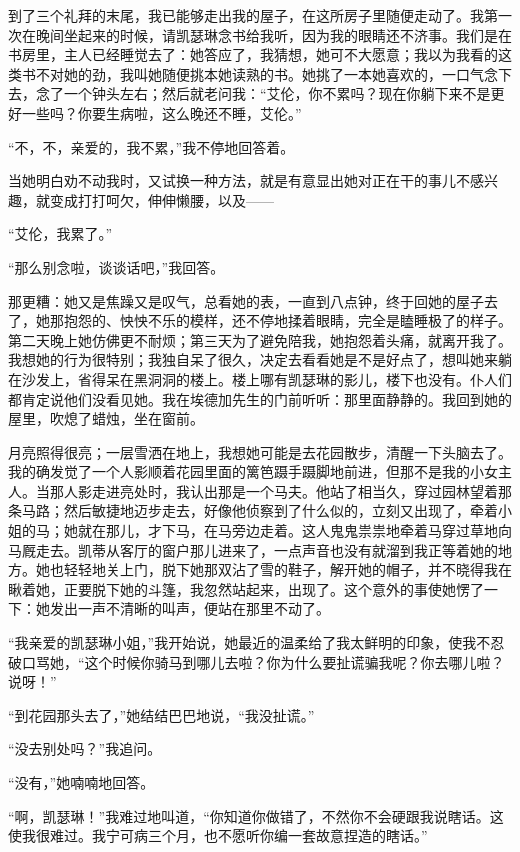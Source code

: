 \par 到了三个礼拜的末尾，我已能够走出我的屋子，在这所房子里随便走动了。我第一次在晚间坐起来的时候，请凯瑟琳念书给我听，因为我的眼睛还不济事。我们是在书房里，主人已经睡觉去了：她答应了，我猜想，她可不大愿意；我以为我看的这类书不对她的劲，我叫她随便挑本她读熟的书。她挑了一本她喜欢的，一口气念下去，念了一个钟头左右；然后就老问我：“艾伦，你不累吗？现在你躺下来不是更好一些吗？你要生病啦，这么晚还不睡，艾伦。”
\par “不，不，亲爱的，我不累，”我不停地回答着。
\par 当她明白劝不动我时，又试换一种方法，就是有意显出她对正在干的事儿不感兴趣，就变成打打呵欠，伸伸懒腰，以及——
\par “艾伦，我累了。”
\par “那么别念啦，谈谈话吧，”我回答。
\par 那更糟：她又是焦躁又是叹气，总看她的表，一直到八点钟，终于回她的屋子去了，她那抱怨的、怏怏不乐的模样，还不停地揉着眼睛，完全是瞌睡极了的样子。第二天晚上她仿佛更不耐烦；第三天为了避免陪我，她抱怨着头痛，就离开我了。我想她的行为很特别；我独自呆了很久，决定去看看她是不是好点了，想叫她来躺在沙发上，省得呆在黑洞洞的楼上。楼上哪有凯瑟琳的影儿，楼下也没有。仆人们都肯定说他们没看见她。我在埃德加先生的门前听听：那里面静静的。我回到她的屋里，吹熄了蜡烛，坐在窗前。
\par 月亮照得很亮；一层雪洒在地上，我想她可能是去花园散步，清醒一下头脑去了。我的确发觉了一个人影顺着花园里面的篱笆蹑手蹑脚地前进，但那不是我的小女主人。当那人影走进亮处时，我认出那是一个马夫。他站了相当久，穿过园林望着那条马路；然后敏捷地迈步走去，好像他侦察到了什么似的，立刻又出现了，牵着小姐的马；她就在那儿，才下马，在马旁边走着。这人鬼鬼祟祟地牵着马穿过草地向马厩走去。凯蒂从客厅的窗户那儿进来了，一点声音也没有就溜到我正等着她的地方。她也轻轻地关上门，脱下她那双沾了雪的鞋子，解开她的帽子，并不晓得我在瞅着她，正要脱下她的斗篷，我忽然站起来，出现了。这个意外的事使她愣了一下：她发出一声不清晰的叫声，便站在那里不动了。
\par “我亲爱的凯瑟琳小姐，”我开始说，她最近的温柔给了我太鲜明的印象，使我不忍破口骂她，“这个时候你骑马到哪儿去啦？你为什么要扯谎骗我呢？你去哪儿啦？说呀！”
\par “到花园那头去了，”她结结巴巴地说，“我没扯谎。”
\par “没去别处吗？”我追问。
\par “没有，”她喃喃地回答。
\par “啊，凯瑟琳！”我难过地叫道，“你知道你做错了，不然你不会硬跟我说瞎话。这使我很难过。我宁可病三个月，也不愿听你编一套故意捏造的瞎话。”

